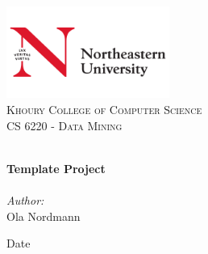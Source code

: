 
\begin{titlepage}
\vbox{ }
\vbox{ }
\begin{center}
\includegraphics[width=0.40\textwidth]{images/NEU-Logo.png}\\[1cm]
\textsc{\LARGE Khoury College of Computer Science}\\[1.5cm]
\textsc{\Large CS 6220 - Data Mining}\\[0.5cm]
\vbox{ }

\HRule \\[0.4cm]
{ \huge \bfseries Template Project}\\[0.4cm]
\HRule \\[1.5cm]

\large
\emph{Author:}\\
Ola Nordmann
\vfill

{\large Date}
\end{center}
\end{titlepage}